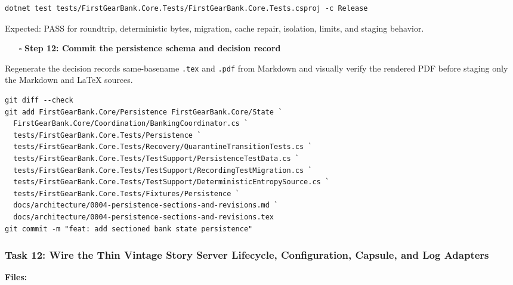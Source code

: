 \documentclass[
  10pt,
  letterpaper,
]{article}
\newcommand{\passthrough}[1]{#1}
\providecommand{\tightlist}{%
  \setlength{\itemsep}{0pt}\setlength{\parskip}{0pt}}
\begin{document}
\begin{lstlisting}
dotnet test tests/FirstGearBank.Core.Tests/FirstGearBank.Core.Tests.csproj -c Release
\end{lstlisting}

Expected: PASS for roundtrip, deterministic bytes, migration, cache
repair, isolation, limits, and staging behavior.

\begin{itemize}
\tightlist
\item[$\square$]
  \textbf{Step 12: Commit the persistence schema and decision record}
\end{itemize}

Regenerate the decision record\textquotesingle s same-basename
\passthrough{\lstinline!.tex!} and \passthrough{\lstinline!.pdf!} from
Markdown and visually verify the rendered PDF before staging only the
Markdown and LaTeX sources.

\begin{lstlisting}
git diff --check
git add FirstGearBank.Core/Persistence FirstGearBank.Core/State `
  FirstGearBank.Core/Coordination/BankingCoordinator.cs `
  tests/FirstGearBank.Core.Tests/Persistence `
  tests/FirstGearBank.Core.Tests/Recovery/QuarantineTransitionTests.cs `
  tests/FirstGearBank.Core.Tests/TestSupport/PersistenceTestData.cs `
  tests/FirstGearBank.Core.Tests/TestSupport/RecordingTestMigration.cs `
  tests/FirstGearBank.Core.Tests/TestSupport/DeterministicEntropySource.cs `
  tests/FirstGearBank.Core.Tests/Fixtures/Persistence `
  docs/architecture/0004-persistence-sections-and-revisions.md `
  docs/architecture/0004-persistence-sections-and-revisions.tex
git commit -m "feat: add sectioned bank state persistence"
\end{lstlisting}

\subsubsection{Task 12: Wire the Thin Vintage Story Server Lifecycle,
Configuration, Capsule, and Log
Adapters}\label{task-12-wire-the-thin-vintage-story-server-lifecycle-configuration-capsule-and-log-adapters}

\textbf{Files:}
\end{document}

